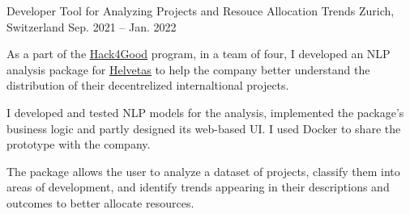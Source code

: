 \begin{cventries}
    \cventry
    {Developer}
    {Tool for Analyzing Projects and Resouce Allocation Trends}
    {Zurich, Switzerland}
    {Sep. 2021 -- Jan. 2022}
    {
        \begin{cvitems}
        \item As a part of the \href{https://analytics-club.org/wordpress/hack4good/}{\uline{Hack4Good}} program, in a team of four, I developed an NLP analysis package for \href{https://www.helvetas.org/en/switzerland}{\uline{Helvetas}} to help the company better understand the distribution of their decentrelized internaltional projects.
        \item I developed and tested NLP models for the analysis, implemented the package's business logic and partly designed its web-based UI. I used Docker to share the prototype with the company.
        \item The package allows the user to analyze a dataset of projects, classify them into areas of development, and identify trends appearing in their descriptions and outcomes to better allocate resources.
        \end{cvitems}
    }

    


\end{cventries}
